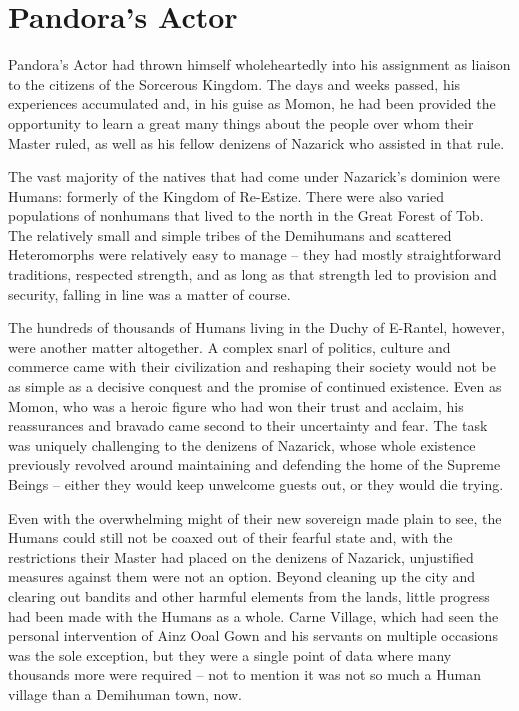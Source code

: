 \chapter{Pandora's Actor}

Pandora’s Actor had thrown himself wholeheartedly into his assignment as liaison to the citizens of the Sorcerous Kingdom. The days and weeks passed, his experiences accumulated and, in his guise as Momon, he had been provided the opportunity to learn a great many things about the people over whom their Master ruled, as well as his fellow denizens of Nazarick who assisted in that rule.

 

The vast majority of the natives that had come under Nazarick’s dominion were Humans: formerly of the Kingdom of Re-Estize. There were also varied populations of nonhumans that lived to the north in the Great Forest of Tob. The relatively small and simple tribes of the Demihumans and scattered Heteromorphs were relatively easy to manage – they had mostly straightforward traditions, respected strength, and as long as that strength led to provision and security, falling in line was a matter of course.

 

The hundreds of thousands of Humans living in the Duchy of E-Rantel, however, were another matter altogether. A complex snarl of politics, culture and commerce came with their civilization and reshaping their society would not be as simple as a decisive conquest and the promise of continued existence. Even as Momon, who was a heroic figure who had won their trust and acclaim, his reassurances and bravado came second to their uncertainty and fear. The task was uniquely challenging to the denizens of Nazarick, whose whole existence previously revolved around maintaining and defending the home of the Supreme Beings – either they would keep unwelcome guests out, or they would die trying.

 

Even with the overwhelming might of their new sovereign made plain to see, the Humans could still not be coaxed out of their fearful state and, with the restrictions their Master had placed on the denizens of Nazarick, unjustified measures against them were not an option. Beyond cleaning up the city and clearing out bandits and other harmful elements from the lands, little progress had been made with the Humans as a whole. Carne Village, which had seen the personal intervention of Ainz Ooal Gown and his servants on multiple occasions was the sole exception, but they were a single point of data where many thousands more were required – not to mention it was not so much a Human village than a Demihuman town, now.

